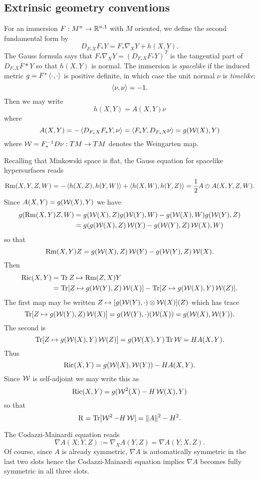 \documentclass[a4paper, 12pt]{amsart}
\begin{document}
\subsection{Extrinsic geometry conventions}
\label{subsec:notation_extrinsic}

For an immersion \(F : M^n \to \R^{n,1}\) with \(M\) oriented, we define the second fundamental form by
\[
D_{F_{\ast} X} F_{\ast} Y = F_{\ast} \nabla_X Y + h(X, Y).
\]
The Gauss formula says that \(F_{\ast} \nabla_X Y = (D_{F_{\ast} X} F_{\ast} Y)^T\) is the tangential part of \(D_{F_{\ast} X} F{\ast} Y\) so that \(h(X, Y)\) is normal. The immersion is \emph{spacelike} if the induced metric \(g = F^{\ast} \inpr{\cdot}{\cdot}\) is positive definite, in which case the unit normal \(\nu\) is \emph{timelike}:
\[
\inpr{\nu}{\nu} = -1.
\]
Then we may write
\[
h(X, Y) = A(X, Y) \nu
\]
where
\[
A(X, Y) = -\inpr{D_{F_{\ast} X} F_{\ast} Y}{\nu} = \inpr{F_{\ast} Y}{D_{F_{\ast} X} \nu} = g(\W(X), Y)
\]
where \(\W = F_{\ast}^{-1} D\nu: TM \to TM\) denotes the Weingarten map.

Recalling that Minkowski space is flat, the Gauss equation for spacelike hypersurfaces reads
\[
\Rm(X, Y, Z, W) = -\inpr{h(X, Z)}{h(Y, W)} + \inpr{h(X, W)}{h(Y, Z)} = \frac{1}{2} A \owedge A (X, Y, Z, W).
\]
Since \(A(X, Y) = g(\W(X), Y)\) we have
\begin{align*}
g(\Rm(X, Y) Z, W) &= g(\W(X), Z) g(\W(Y), W) - g(\W(X), W) g(\W(Y), Z) \\
&= g(g(\W(X), Z) \W(Y) - g(\W(Y), Z) \W(X), W)
\end{align*}
so that
\[
\Rm(X, Y) Z = g(\W(X), Z) \W(Y) - g(\W(Y), Z) \W(X).
\]
Then
\[
\begin{split}
\Ric(X, Y) &= \Tr Z \mapsto \Rm(Z, X) Y \\
&= \Tr [Z \mapsto g(\W(Y), Z) \W(X)] - \Tr[Z \mapsto g(\W(X), Y) \W(Z)].
\end{split}
\]
The first map may be written \(Z \mapsto [g(\W(Y), \cdot) \otimes \W(X)] (Z)\) which has trace
\[
\Tr [Z \mapsto g(\W(Y), Z) \W(X)] = g(\W(Y), \cdot) (\W(X)) = g(\W(X), \W(Y)).
\]
The second is
\[
\Tr [Z \mapsto g(\W(X), Y) \W(Z)] = g(\W(X), Y) \Tr \W = H A(X, Y).
\]
Thus
\[
\Ric(X, Y) = g(\W(X),\W(Y)) - H A(X, Y).
\]
Since \(\W\) is self-adjoint we may write this as
\[
\Ric(X, Y) = g(\W^2(X) - H \W(X), Y)
\]
so that
\[
\Sc = \Tr [\W^2 - H\W] = \|A\|^2 - H^2.
\]

The Codazzi-Mainardi equation reads
\[
\nabla A (X; Y, Z) := \nabla_X A (Y, Z) = \nabla A(Y; X, Z).
\]
Of course, since \(A\) is already symmetric, \(\nabla A\) is automatically symmetric in the last two slots hence the Codazzi-Mainardi equation implies \(\nabla A\) becomes fully symmetric in all three slots.
\end{document}
